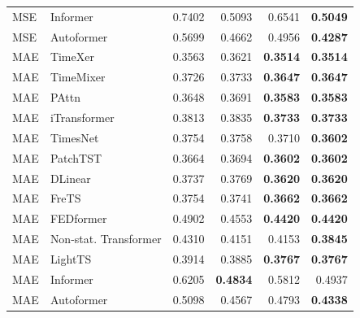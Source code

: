 \begin{longtable}{llrrrr}
MSE & Informer & 0.7402 & 0.5093 & 0.6541 & \textbf{0.5049} \\
MSE & Autoformer & 0.5699 & 0.4662 & 0.4956 & \textbf{0.4287} \\
\midrule
MAE & TimeXer & 0.3563 & 0.3621 & \textbf{0.3514} & \textbf{0.3514} \\
MAE & TimeMixer & 0.3726 & 0.3733 & \textbf{0.3647} & \textbf{0.3647} \\
MAE & PAttn & 0.3648 & 0.3691 & \textbf{0.3583} & \textbf{0.3583} \\
MAE & iTransformer & 0.3813 & 0.3835 & \textbf{0.3733} & \textbf{0.3733} \\
MAE & TimesNet & 0.3754 & 0.3758 & 0.3710 & \textbf{0.3602} \\
MAE & PatchTST & 0.3664 & 0.3694 & \textbf{0.3602} & \textbf{0.3602} \\
MAE & DLinear & 0.3737 & 0.3769 & \textbf{0.3620} & \textbf{0.3620} \\
MAE & FreTS & 0.3754 & 0.3741 & \textbf{0.3662} & \textbf{0.3662} \\
MAE & FEDformer & 0.4902 & 0.4553 & \textbf{0.4420} & \textbf{0.4420} \\
MAE & Non-stat. Transformer & 0.4310 & 0.4151 & 0.4153 & \textbf{0.3845} \\
MAE & LightTS & 0.3914 & 0.3885 & \textbf{0.3767} & \textbf{0.3767} \\
MAE & Informer & 0.6205 & \textbf{0.4834} & 0.5812 & 0.4937 \\
MAE & Autoformer & 0.5098 & 0.4567 & 0.4793 & \textbf{0.4338} \\
\end{longtable}
\endgroup

